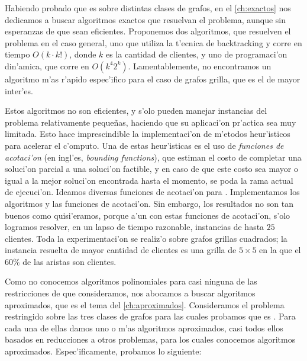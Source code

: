 Habiendo probado que  es  sobre distintas clases de grafos, en el \autoref{ch:exactos} nos dedicamos a buscar algoritmos exactos que resuelvan el problema, aunque sin esperanzas de que sean eficientes. Proponemos dos algoritmos, que resuelven el problema en el caso general, uno que utiliza la t'ecnica de backtracking y corre en tiempo $O(k \cdot k!)$, donde $k$ es la cantidad de clientes, y uno de programaci'on din'amica, que corre en $O(k^4 2^k)$. Lamentablemente, no encontramos un algoritmo m'as r'apido espec'ifico para el caso de grafos grilla, que es el de mayor inter'es.

Estos algoritmos no son eficientes, y s'olo pueden manejar instancias del problema relativamente peque\~nas, haciendo que su aplicaci'on pr'actica sea muy limitada. Esto hace imprescindible la implementaci'on de m'etodos heur'isticos para acelerar el c'omputo. Una de estas heur'isticas es el uso de \textit{funciones de acotaci'on} (en ingl'es, \textit{bounding functions}), que estiman el costo de completar una soluci'on parcial a una soluci'on factible, y en caso de que este costo sea mayor o igual a la mejor soluci'on encontrada hasta el momento, se poda la rama actual de ejecuci'on. Ideamos diversas funciones de acotaci'on para . Implementamos los algoritmos y las funciones de acotaci'on. Sin embargo, los resultados no son tan buenos como quisi'eramos, porque a'un con estas funciones de acotaci'on, s'olo logramos resolver, en un lapso de tiempo razonable, instancias de hasta $25$ clientes. Toda la experimentaci'on se realiz'o sobre grafos grillas cuadrados; la instancia resuelta de mayor cantidad de clientes es una grilla de $5 \times 5$ en la que el $60\%$ de las aristas son clientes.

Como no conocemos algoritmos polinomiales para casi ninguna de las restricciones de  que consideramos, nos abocamos a buscar algoritmos aproximados, que es el tema del \autoref{ch:aproximados}. Consideramos el problema restringido sobre las tres clases de grafos para las cuales probamos que  es . Para cada una de ellas damos uno o m'as algoritmos aproximados, casi todos ellos basados en reducciones a otros problemas, para los cuales conocemos algoritmos aproximados. Espec'ificamente, probamos lo siguiente:

